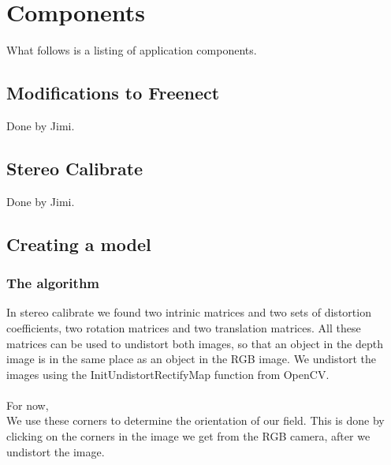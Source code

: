 

\section{Components}

What follows is a listing of application components.

\subsection{Modifications to Freenect}

Done by Jimi.

\subsection{Stereo Calibrate}

Done by Jimi.

\subsection{Creating a model}
\subsubsection{The algorithm}
In stereo calibrate we found two intrinic matrices and two sets of distortion coefficients, two rotation matrices and two translation matrices. All these matrices can be used to undistort both images, so that an object in the depth image is in the same place as an object in the RGB image. We undistort the images using the InitUndistortRectifyMap function from OpenCV. \\
\\
 For now,  \\
We use these corners to determine the orientation of our field. This is done by clicking on the corners in the image we get from the RGB camera, after we undistort the image. 

